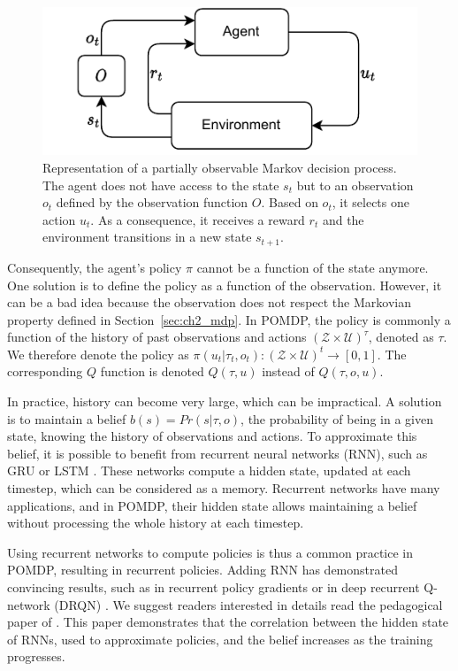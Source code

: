\begin{figure}
    \centering
    \includegraphics[width=.8\linewidth]{tex_thesis/figures/ch2/POMDP.pdf}
    \caption{Representation of a partially observable Markov decision process\citep{KAELBLING199899}. The agent does not have access to the state $s_t$ but to an observation $o_t$ defined by the observation function $O$. Based on $o_t$, it selects one action $u_t$. As a consequence, it receives a reward $r_t$ and the environment transitions in a new state $s_{t+1}$.}
    \label{fig:ch2_pomdp}
\end{figure}


Consequently, the agent's policy $\pi$ cannot be a function of the state anymore.
One solution is to define the policy as a function of the observation.
However, it can be a bad idea because the observation does not respect the Markovian property defined in Section~\ref{sec:ch2_mdp}.
In POMDP, the policy is commonly a function of the history of past observations and actions $(\mathcal{Z} \times \mathcal{U})^\tau$, denoted as $\tau$.
We therefore denote the policy as $\pi(u_t|\tau_t,o_t): (\mathcal{Z} \times \mathcal{U})^t \rightarrow [0,1]$.
The corresponding $Q$ function is denoted $Q(\tau,u)$ instead of $Q(\tau,o, u)$.

In practice, history can become very large, which can be impractical.
A solution is to maintain a belief $b(s)=Pr(s|\tau,o)$, the probability of being in a given state, knowing the history of observations and actions.
To approximate this belief, it is possible to benefit from recurrent neural networks (RNN), such as GRU \citep{Chung2014EmpiricalModeling} or LSTM \citep{Hochreiter1997LongMemory}.
These networks compute a hidden state, updated at each timestep, which can be considered as a memory.
Recurrent networks have many applications, and in POMDP, their hidden state allows maintaining a belief without processing the whole history at each timestep.

Using recurrent networks to compute policies is thus a common practice in POMDP, resulting in recurrent policies.
Adding RNN has demonstrated convincing results, such as in recurrent policy gradients \citep{wierstra2010recurrent} or in deep recurrent Q-network (DRQN) \citep{Hausknecht2015DeepMDPs}.
We suggest readers interested in details read the pedagogical paper of \cite{lambrechts2022recurrent}.
This paper demonstrates that the correlation between the hidden state of RNNs, used to approximate policies, and the belief increases as the training progresses.

